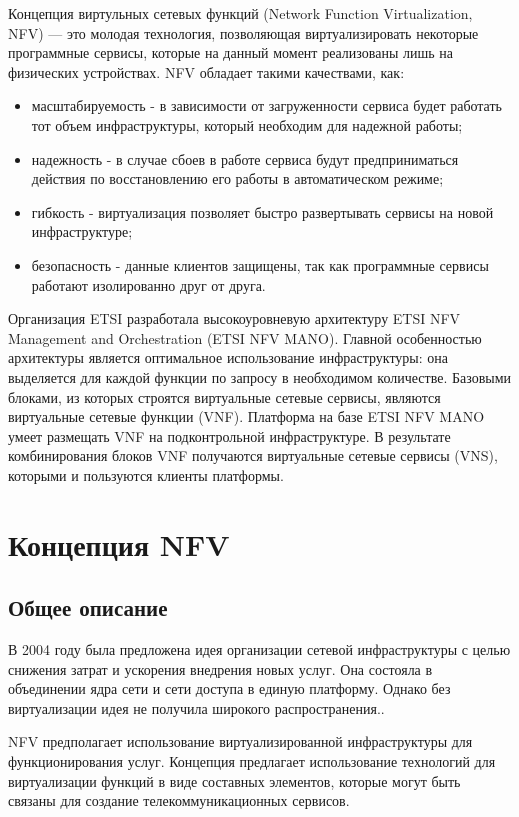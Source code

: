 \documentclass[oneside,final,14pt,a4paper]{extreport}
\begin{document}
Концепция виртульных сетевых функций (Network Function Virtualization, NFV) --- это молодая технология, позволяющая виртуализировать некоторые программные сервисы, которые на данный момент реализованы лишь на физических устройствах. NFV обладает такими качествами, как:
\begin{itemize}
	\item масштабируемость - в зависимости от загруженности сервиса будет работать тот объем инфраструктуры, который необходим для надежной работы;
	\item надежность - в случае сбоев в работе сервиса будут предприниматься действия по восстановлению его работы в автоматическом режиме;
	\item гибкость - виртуализация позволяет быстро развертывать сервисы на новой инфраструктуре;
	\item безопасность - данные клиентов защищены, так как программные сервисы работают изолированно друг от друга.
\end{itemize}

Организация ETSI разработала высокоуровневую архитектуру ETSI NFV Management and Orchestration (ETSI NFV MANO). Главной особенностью архитектуры является оптимальное использование инфраструктуры: она выделяется для каждой функции по запросу в необходимом количестве. Базовыми блоками, из которых строятся виртуальные сетевые сервисы, являются виртуальные сетевые функции (VNF). Платформа на базе ETSI NFV MANO умеет размещать VNF на подконтрольной инфраструктуре. В результате комбинирования блоков VNF получаются виртуальные сетевые сервисы (VNS), которыми и пользуются клиенты платформы.





\chapter{Концепция NFV}
\section{Общее описание}
В 2004 году была предложена идея организации сетевой инфраструктуры с целью снижения затрат и ускорения внедрения новых услуг. Она состояла в объединении ядра сети и сети доступа в единую платформу. Однако без виртуализации идея не получила широкого распространения.\cite{nfv-state2}.

NFV предполагает использование виртуализированной инфраструктуры для функционирования услуг. Концепция предлагает использование технологий для виртуализации функций в виде составных элементов, которые могут быть связаны для создание телекоммуникационных сервисов. 
\end{document}
